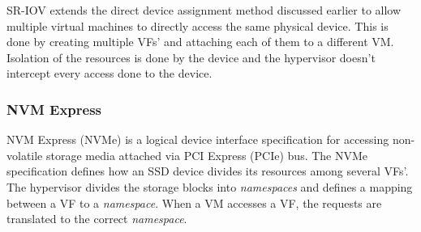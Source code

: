 SR-IOV extends the direct device assignment method discussed earlier to allow multiple virtual machines to directly access the same physical device.
This is done by creating multiple VFs' and attaching each of them to a different VM. Isolation of the resources is done by the device and the hypervisor doesn't
intercept every access done to the device.

\subsubsection{NVM Express}
\label{subsec:nvme}
NVM Express (NVMe) is a logical device interface specification for accessing non-volatile storage media attached via PCI Express (PCIe) bus.
The NVMe specification defines how an SSD device divides its resources among several VFs'. The hypervisor divides the storage blocks into \emph{namespaces}
and defines a mapping between a VF to a \emph{namespace}. When a VM accesses a VF, the requests are translated to the correct \emph{namespace}.





















